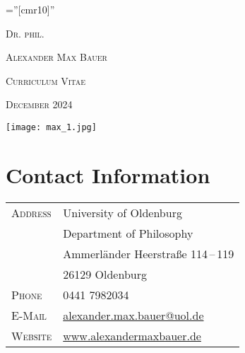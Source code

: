 \documentclass[a4paper,10pt]{article}
\begin{document}
\pagestyle{plain}
\font\fb=''[cmr10]''

\par{\centering
   {\Large\textsc{Dr\hspace{0.5pt}. phil\hspace{0.5pt}.}
   }\bigskip\par}

\par{\centering
   {\Huge\textsc{Alexander Max Bauer}
   }\bigskip\par}

\vspace{1cm}
\par{\centering
   {\Large\textsc{Curriculum Vitae}
   }\bigskip\par}

\par{\centering
   {\Large\textsc{December 2024}
   }\bigskip\par}

\vspace{1cm}
\begin{center}
   \texttt{[image: max\_1.jpg]}
\end{center}
\vspace{1cm}


\section{Contact Information}
\begin{longtable}{p{}p{}}
   \textsc{Address}     & University of Oldenburg\\
                        & Department of Philosophy\\
                        & Ammerländer Heerstraße 114\,--\,119\\
                        & 26129 Oldenburg\\
   \textsc{Phone}       & 0441 7982034\\
   \textsc{E-Mail}      & \href{mailto:alexander.max.bauer@uol.de}{alexander.max.bauer@uol.de}\\
   \textsc{Website}     & \href{http://www.alexandermaxbauer.de/}{www.alexandermaxbauer.de}
\end{longtable}


\clearpage
\end{document}
